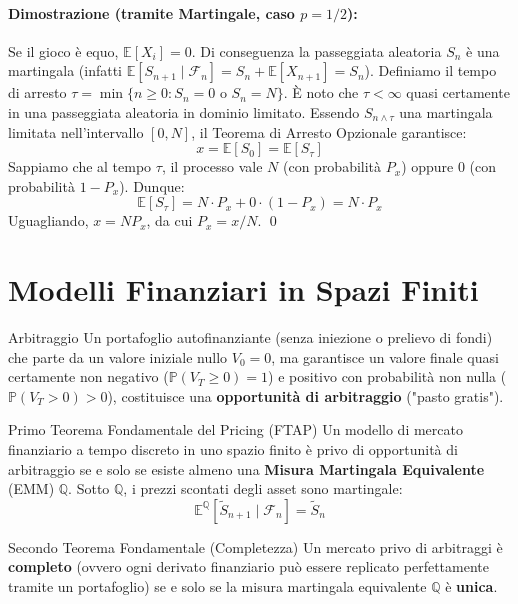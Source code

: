 \documentclass[11pt,a4paper]{article}
\begin{document}
\paragraph{Dimostrazione (tramite Martingale, caso $p=1/2$):}
Se il gioco è equo, $\mathbb{E}[X_i] = 0$. Di conseguenza la passeggiata aleatoria $S_n$ è una martingala (infatti $\mathbb{E}[S_{n+1} \mid \mathcal{F}_n] = S_n + \mathbb{E}[X_{n+1}] = S_n$).
Definiamo il tempo di arresto $\tau = \min\{n \ge 0 : S_n = 0 \text{ o } S_n = N\}$. È noto che $\tau < \infty$ quasi certamente in una passeggiata aleatoria in dominio limitato.
Essendo $S_{n \wedge \tau}$ una martingala limitata nell'intervallo $[0, N]$, il Teorema di Arresto Opzionale garantisce:
\[ x = \mathbb{E}[S_0] = \mathbb{E}[S_\tau] \]
Sappiamo che al tempo $\tau$, il processo vale $N$ (con probabilità $P_x$) oppure $0$ (con probabilità $1-P_x$).
Dunque:
\[ \mathbb{E}[S_\tau] = N \cdot P_x + 0 \cdot (1-P_x) = N \cdot P_x \]
Uguagliando, $x = N P_x$, da cui $P_x = x/N$.
\qed

\newpage
\section{Modelli Finanziari in Spazi Finiti}

\begin{definizione}{Arbitraggio}{}
Un portafoglio autofinanziante (senza iniezione o prelievo di fondi) che parte da un valore iniziale nullo $V_0 = 0$, ma garantisce un valore finale quasi certamente non negativo ($\mathbb{P}(V_T \ge 0) = 1$) e positivo con probabilità non nulla ($\mathbb{P}(V_T > 0) > 0$), costituisce una \textbf{opportunità di arbitraggio} ("pasto gratis").
\end{definizione}

\begin{teorema}{Primo Teorema Fondamentale del Pricing (FTAP)}{}
Un modello di mercato finanziario a tempo discreto in uno spazio finito è privo di opportunità di arbitraggio se e solo se esiste almeno una \textbf{Misura Martingala Equivalente} (EMM) $\mathbb{Q}$.
Sotto $\mathbb{Q}$, i prezzi scontati degli asset sono martingale: 
\[ \mathbb{E}^{\mathbb{Q}}[ \tilde{S}_{n+1} \mid \mathcal{F}_n ] = \tilde{S}_n \]
\end{teorema}

\begin{teorema}{Secondo Teorema Fondamentale (Completezza)}{}
Un mercato privo di arbitraggi è \textbf{completo} (ovvero ogni derivato finanziario può essere replicato perfettamente tramite un portafoglio) se e solo se la misura martingala equivalente $\mathbb{Q}$ è \textbf{unica}.
\end{teorema}
\end{document}
